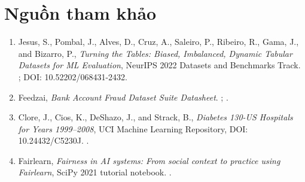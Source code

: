 \section{Nguồn tham khảo}

\begin{enumerate}
  \item Jesus, S., Pombal, J., Alves, D., Cruz, A., Saleiro, P., Ribeiro, R., Gama, J., and Bizarro, P., \textit{Turning the Tables: Biased, Imbalanced, Dynamic Tabular Datasets for ML Evaluation}, NeurIPS 2022 Datasets and Benchmarks Track. ; DOI: 10.52202/068431-2432.
  \item Feedzai, \textit{Bank Account Fraud Dataset Suite Datasheet}. ; .
  \item Clore, J., Cios, K., DeShazo, J., and Strack, B., \textit{Diabetes 130-US Hospitals for Years 1999--2008}, UCI Machine Learning Repository, DOI: 10.24432/C5230J. .
  \item Fairlearn, \textit{Fairness in AI systems: From social context to practice using Fairlearn}, SciPy 2021 tutorial notebook. .
\end{enumerate}
